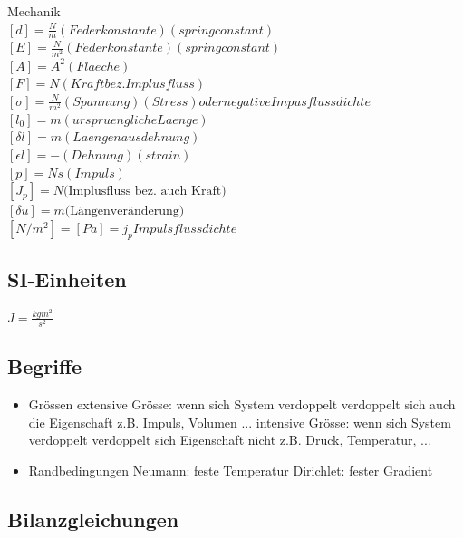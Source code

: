 \documentclass[a4paper]{scrartcl}
\begin{document}
Mechanik\\
$ [d]=\frac{N}{m} (Federkonstante)(spring constant)$\\
$ [E]=\frac{N}{m^2} (Federkonstante)(spring constant)$\\
$ [A]=A^2 (Flaeche)$\\
$ [F]=N (Kraft bez. Implusfluss)$\\
$ [\sigma]=\frac{N}{m^2} (Spannung)(Stress)oder negative Impusflussdichte$\\
$ [l_0]=m (urspruengliche Laenge)$\\
$ [\delta l]=m (Laengenausdehnung)$\\
$ [\epsilon l]=- (Dehnung)(strain)$\\
$ [p]=Ns (Impuls)$\\
$ [J_p]  = N \text{(Implusfluss bez. auch Kraft)} $\\
$ [\delta u] = m \text{(Längenveränderung)}$\\
$ [N/m^2] = [Pa] = j_p Impulsflussdichte$\\




\subsection{SI-Einheiten}
$ J = \frac{kg m^2}{s^2} $\\

\subsection{Begriffe}
\begin{itemize}
\item Grössen
\subitem extensive Grösse: wenn sich System verdoppelt verdoppelt sich auch die Eigenschaft z.B. Impuls, Volumen ...
\subitem intensive Grösse: wenn sich System verdoppelt verdoppelt sich Eigenschaft nicht z.B. Druck, Temperatur, ...
\item Randbedingungen
\subitem Neumann: feste Temperatur
\subitem Dirichlet: fester Gradient
\end{itemize}


\subsection{Bilanzgleichungen}
\end{document}
